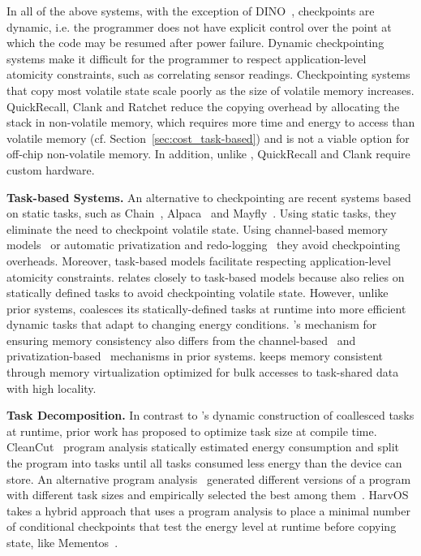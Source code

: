 In all of the above systems, with the exception of DINO~\cite{dino},
checkpoints are dynamic, i.e. the programmer does not have explicit control
over the point at which the code may be resumed after power failure.
%
Dynamic checkpointing systems make it difficult for the programmer to respect
application-level atomicity constraints, such as correlating sensor readings.
%
Checkpointing systems that copy most volatile state scale poorly as the
size of volatile memory increases.  QuickRecall, Clank and Ratchet reduce
the copying overhead by allocating the stack in non-volatile memory, which
requires more time and energy to access than volatile memory (cf.
Section~\ref{sec:cost_task-based}) and is not a viable option for off-chip non-volatile
memory. In addition, unlike \sys, QuickRecall and Clank require custom hardware.  

\textbf{Task-based Systems.} An alternative to checkpointing are recent systems
based on static tasks, such as Chain~\cite{chain}, Alpaca~\cite{alpaca} and
Mayfly~\cite{hester_sensys_2017}. Using static tasks, they eliminate
the need to checkpoint volatile state. Using channel-based memory
models~\cite{chain,hester_sensys_2017} or automatic privatization and
redo-logging~\cite{alpaca} they avoid checkpointing overheads. Moreover,
task-based models facilitate respecting application-level atomicity
constraints.
%
\sys relates closely to task-based models because \sys also relies on
statically defined tasks to avoid checkpointing volatile state. 
%
However, unlike prior systems, \sys coalesces its statically-defined tasks at
runtime into more efficient dynamic tasks that adapt to changing energy
conditions.
%
\sys's mechanism for ensuring memory consistency also differs from the
channel-based~\cite{chain} and privatization-based~\cite{alpaca} mechanisms in
prior systems. \sys keeps memory consistent through memory virtualization
optimized for bulk accesses to task-shared data with high locality. 

\textbf{Task Decomposition.} In contrast to \sys's dynamic construction of
coallesced tasks at runtime, prior work has proposed to optimize task size
at compile time. CleanCut~\cite{cleancut_2018} program analysis statically
estimated energy consumption and split the program into tasks until all tasks
consumed less energy than the device can store.
%
An alternative program analysis~\cite{baghsorkhi_cgo_2018} generated different
versions of a program with different task sizes and empirically selected the
best among them~\cite{baghsorkhi_cgo_2018}.
%
HarvOS~\cite{mottola2017harvos} takes a hybrid approach that uses a program
analysis to place a minimal number of conditional checkpoints that test the
energy level at runtime before copying state, like Mementos~\cite{mementos}.

